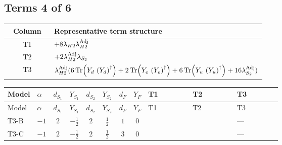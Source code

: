 \documentclass[8pt]{article}
\begin{document}
\begin{landscape}
\subsection*{Terms 4 of 6}
\begin{center}
\begin{tabular}{@{}c >{\raggedright\arraybackslash}p{0.82\linewidth}@{}}
\toprule
Column & Representative term structure \\
\midrule
T1 & \(\displaystyle +8 {\lambda_{H2}} {\lambda_{H2}^{\rm Adj}}\) \\
\midrule
T2 & \(\displaystyle +2 {\lambda_{H2}^{\rm Adj}} {\lambda_{S_2}}\) \\
\midrule
T3 & \(\displaystyle {\lambda_{H2}^{\rm Adj}} (6 \operatorname{Tr}\!\left({Y_d}\,\left({Y_d}\right)^{\dagger}\right)+2 \operatorname{Tr}\!\left({Y_e}\,\left({Y_e}\right)^{\dagger}\right)+6 \operatorname{Tr}\!\left({Y_u}\,\left({Y_u}\right)^{\dagger}\right)+16 {\lambda_{S_2}^{\rm Adj}})\) \\
\midrule
\bottomrule
\end{tabular}
\end{center}
\smallskip
\tiny
\begin{longtable}{@{}llcccccc >{\raggedright\arraybackslash}p{0.21\linewidth} >{\raggedright\arraybackslash}p{0.21\linewidth} >{\raggedright\arraybackslash}p{0.21\linewidth}@{}}
\toprule
Model & $\alpha$ & $d_{S_1}$ & $Y_{S_1}$ & $d_{S_2}$ & $Y_{S_2}$ & $d_F$ & $Y_F$ & T1 & T2 & T3 \\
\midrule
\endfirsthead
\toprule
Model & $\alpha$ & $d_{S_1}$ & $Y_{S_1}$ & $d_{S_2}$ & $Y_{S_2}$ & $d_F$ & $Y_F$ & T1 & T2 & T3 \\
\midrule
\endhead
T3-B & $-1$ & $2$ & $-\frac{1}{2}$ & $2$ & $\frac{1}{2}$ & $1$ & $0$ & \scriptsize\adjustbox{max width=\linewidth}{$\begin{gathered} +8 {\lambda_{H2}} {\lambda_{H2}^{\rm Adj}}\end{gathered}$} & \scriptsize\adjustbox{max width=\linewidth}{$\begin{gathered} +2 {\lambda_{H2}^{\rm Adj}} {\lambda_{S_2}}\end{gathered}$} & --- \\
\midrule
T3-C & $-1$ & $2$ & $-\frac{1}{2}$ & $2$ & $\frac{1}{2}$ & $3$ & $0$ & \scriptsize\adjustbox{max width=\linewidth}{$\begin{gathered} +8 {\lambda_{H2}} {\lambda_{H2}^{\rm Adj}}\end{gathered}$} & \scriptsize\adjustbox{max width=\linewidth}{$\begin{gathered} +2 {\lambda_{H2}^{\rm Adj}} {\lambda_{S_2}}\end{gathered}$} & --- \\

\end{longtable}
\end{landscape}
\end{document}
